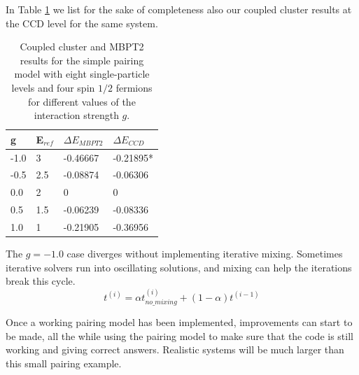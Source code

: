 In Table \ref{tab:selectedbenchmarks} we list for the sake of completeness also our coupled cluster results at the CCD level for the same system.
\begin{table}
\caption{Coupled cluster and MBPT2 results for the simple pairing model with eight single-particle levels and four spin $1/2$ fermions
for different values of the interaction strength $g$.} \label{tab:selectedbenchmarks}
  \begin{center}
      \begin{tabular}{| l | l | l | l |}
      \hline g & E$_{ref}$ & $\Delta E_{MBPT2}$ & $\Delta E_{CCD}$
      \\ \hline -1.0 & 3 & -0.46667 & -0.21895* \\ \hline -0.5 & 2.5 &
      -0.08874 & -0.06306 \\ \hline 0.0 & 2 & 0 & 0 \\ \hline 0.5 &
      1.5 & -0.06239 & -0.08336 \\ \hline 1.0 & 1 & -0.21905 &
      -0.36956 \\ \hline
      \end{tabular}
  \end{center}
\end{table}
  The $g=-1.0$ case diverges without implementing iterative
  mixing. Sometimes iterative solvers run into oscillating solutions,
  and mixing can help the iterations break this cycle.
  \begin{equation}
  t^{(i)} = \alpha t^{(i)}_{no\_mixing} + (1 - \alpha) t^{(i-1)}
  \end{equation}




  Once a working pairing model has been implemented, improvements can
  start to be made, all the while using the pairing model to make sure
  that the code is still working and giving correct answers. Realistic
  systems will be much larger than this small pairing example.

